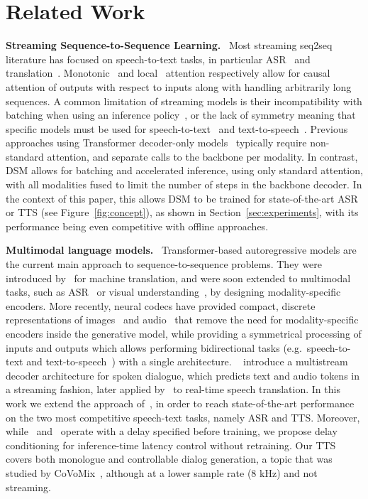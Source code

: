 \documentclass{article}
\begin{document}
\section{Related Work}
\label{sec:related}
\textbf{Streaming Sequence-to-Sequence Learning.}\ 
Most streaming seq2seq literature has focused on speech-to-text tasks, in particular ASR~\citep{streaming_asr} and translation~\citep{xue2023weakly,seamless}. Monotonic~\citep{monotonic_attention, mocha} and local~\citep{local_attention} attention respectively allow for causal attention of outputs with respect to inputs along with handling arbitrarily long sequences. A common limitation of streaming models is their incompatibility with batching when using an inference policy~\citep{seamless}, or the lack of symmetry meaning that specific models must be used for speech-to-text~\citep{streaming_asr} and text-to-speech~\citep{tacotron}.
Previous approaches using Transformer decoder-only models~\citep{guo2024decoder,chen2024streaming} typically require non-standard attention, and separate calls to the backbone per modality.
In contrast, DSM allows for batching and accelerated inference, using only standard attention, with all modalities fused to limit the number of steps in the backbone decoder.
In the context of this paper, this allows DSM to be trained for state-of-the-art ASR or TTS (see Figure~\ref{fig:concept}), as shown in Section~\ref{sec:experiments}, with its performance being even competitive with offline approaches.


\textbf{Multimodal language models.}\ 
Transformer-based autoregressive models are the current main approach to sequence-to-sequence problems. They were introduced by~\citet{attentionvaswani} for machine translation, and were soon extended to multimodal tasks, such as ASR~\citep{whisper} or visual understanding~\citep{flamingo}, by designing modality-specific encoders. More recently, neural codecs have provided compact, discrete representations of images~\citep{Esser2020TamingTF} and audio~\citep{soundstream} that remove the need for modality-specific encoders inside the generative model, while providing a symmetrical processing of inputs and outputs which allows performing bidirectional tasks (e.g.\ speech-to-text and text-to-speech~\citep{audiopalm}) with a single architecture. ~\citet{moshi} introduce a multistream decoder architecture for spoken dialogue, which predicts text and audio tokens in a streaming fashion, later applied by~\citet{hibiki} to real-time speech translation. In this work we extend the approach of~\citet{moshi}, in order to reach state-of-the-art performance on the two most competitive speech-text tasks, namely ASR and TTS.
Moreover, while~\citet{moshi} and~\citet{hibiki} operate with a delay specified before training, we propose delay conditioning for inference-time latency control without retraining.
Our TTS covers both monologue and controllable dialog generation, a topic that was studied by CoVoMix~\citep{zhang2024covomix}, although at a lower sample rate (8 kHz) and not streaming.
\end{document}
